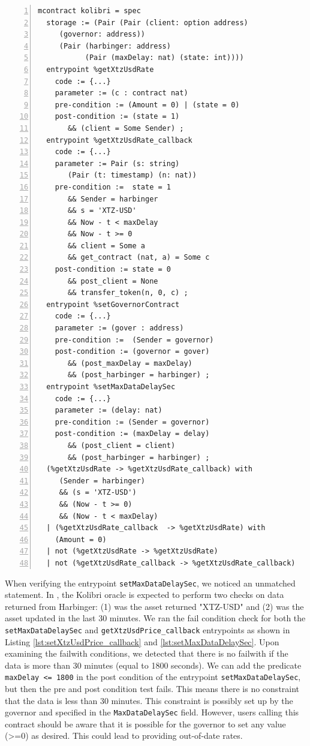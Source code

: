 \documentclass[a4paper,USenglish,cleveref, autoref, thm-restate]{lipics-v2021}
\begin{document}
\begin{lstlisting}[float=tp,captionpos=b,caption={Kolibri oracle contract specification},label={lst:kolibri-contract-specification},numbers=left]
mcontract kolibri = spec 
  storage := (Pair (Pair (client: option address) 
     (governor: address))
     (Pair (harbinger: address) 
           (Pair (maxDelay: nat) (state: int))))
  entrypoint %getXtzUsdRate
    code := {...}
    parameter := (c : contract nat) 
    pre-condition := (Amount = 0) | (state = 0)
    post-condition := (state = 1) 
       && (client = Some Sender) ;
  entrypoint %getXtzUsdRate_callback
    code := {...}
    parameter := Pair (s: string) 
       (Pair (t: timestamp) (n: nat))
    pre-condition :=  state = 1 
       && Sender = harbinger  
       && s = 'XTZ-USD' 
       && Now - t < maxDelay 
       && Now - t >= 0 
       && client = Some a 
       && get_contract (nat, a) = Some c    
    post-condition := state = 0 
       && post_client = None 
       && transfer_token(n, 0, c) ;
  entrypoint %setGovernorContract
    code := {...}
    parameter := (gover : address) 
    pre-condition :=  (Sender = governor)                  
    post-condition := (governor = gover) 
       && (post_maxDelay = maxDelay) 
       && (post_harbinger = harbinger) ;
  entrypoint %setMaxDataDelaySec
    code := {...}
    parameter := (delay: nat)
    pre-condition := (Sender = governor)             
    post-condition := (maxDelay = delay) 
       && (post_client = client) 
       && (post_harbinger = harbinger) ;
  (%getXtzUsdRate -> %getXtzUsdRate_callback) with
     (Sender = harbinger)
     && (s = 'XTZ-USD') 
     && (Now - t >= 0)  
     && (Now - t < maxDelay)  
  | (%getXtzUsdRate_callback  -> %getXtzUsdRate) with 
    (Amount = 0) 
  | not (%getXtzUsdRate -> %getXtzUsdRate) 
  | not (%getXtzUsdRate_callback -> %getXtzUsdRate_callback)
\end{lstlisting}
When verifying the entrypoint \lstinline/setMaxDataDelaySec/, we noticed an unmatched statement. In \cite{kolibri}, the Kolibri oracle is expected to perform two checks on data returned from Harbinger: (1) was the asset returned "XTZ-USD" and (2) was the asset updated in the last 30 minutes. We ran the fail condition check for both the \lstinline/setMaxDataDelaySec/ and \lstinline/getXtzUsdPrice_callback/ entrypoints as shown in Listing \ref{lst:setXtzUsdPrice_callback} and \ref{lst:setMaxDataDelaySec}. Upon examining the failwith conditions, we detected that there is no failwith if the data is more than 30 minutes (equal to 1800 seconds). We can add the predicate \lstinline/maxDelay <= 1800/ in the post condition of the entrypoint \lstinline/setMaxDataDelaySec/, but then the pre and post condition test fails. This means there is no constraint that the data is less than 30 minutes. This constraint is possibly set up by the governor and specified in the \lstinline/MaxDataDelaySec/ field. However, users calling this contract should be aware that it is possible for the governor to set any value (>=0) as desired. This could lead to providing out-of-date rates.
\end{document}
